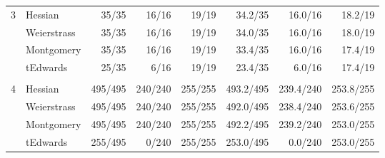 \begin{table}[!h]
\begin{tabular}{llrrrrrr}
\multicolumn{1}{|l|}{\multirow{4}{*}{3}} & \multicolumn{1}{l|}{Hessian}                & \multicolumn{1}{r|}{35/35}   & \multicolumn{1}{r|}{16/16}   & \multicolumn{1}{r|}{19/19}   & \multicolumn{1}{r|}{34.2/35}   & \multicolumn{1}{r|}{16.0/16}   & \multicolumn{1}{r|}{18.2/19}   \\ \cline{2-8} 
\multicolumn{1}{|l|}{}                   & \multicolumn{1}{l|}{Weierstrass}            & \multicolumn{1}{r|}{35/35}   & \multicolumn{1}{r|}{16/16}   & \multicolumn{1}{r|}{19/19}   & \multicolumn{1}{r|}{34.0/35}   & \multicolumn{1}{r|}{16.0/16}   & \multicolumn{1}{r|}{18.0/19}   \\ \cline{2-8} 
\multicolumn{1}{|l|}{}                   & \multicolumn{1}{l|}{Montgomery}             & \multicolumn{1}{r|}{35/35}   & \multicolumn{1}{r|}{16/16}   & \multicolumn{1}{r|}{19/19}   & \multicolumn{1}{r|}{33.4/35}   & \multicolumn{1}{r|}{16.0/16}   & \multicolumn{1}{r|}{17.4/19}   \\ \cline{2-8} 
\multicolumn{1}{|l|}{}                   & \multicolumn{1}{l|}{tEdwards}               & \multicolumn{1}{r|}{25/35}   & \multicolumn{1}{r|}{6/16}    & \multicolumn{1}{r|}{19/19}   & \multicolumn{1}{r|}{23.4/35}   & \multicolumn{1}{r|}{6.0/16}    & \multicolumn{1}{r|}{17.4/19}   \\ \hline  \vspace{-3.2mm}
                                         &                                             &                              &                              &                              &                                &                                &                                \\ \hline
\multicolumn{1}{|l|}{\multirow{4}{*}{4}} & \multicolumn{1}{l|}{Hessian}                & \multicolumn{1}{r|}{495/495} & \multicolumn{1}{r|}{240/240} & \multicolumn{1}{r|}{255/255} & \multicolumn{1}{r|}{493.2/495} & \multicolumn{1}{r|}{239.4/240} & \multicolumn{1}{r|}{253.8/255} \\ \cline{2-8} 
\multicolumn{1}{|l|}{}                   & \multicolumn{1}{l|}{Weierstrass}            & \multicolumn{1}{r|}{495/495} & \multicolumn{1}{r|}{240/240} & \multicolumn{1}{r|}{255/255} & \multicolumn{1}{r|}{492.0/495} & \multicolumn{1}{r|}{238.4/240} & \multicolumn{1}{r|}{253.6/255} \\ \cline{2-8} 
\multicolumn{1}{|l|}{}                   & \multicolumn{1}{l|}{Montgomery}             & \multicolumn{1}{r|}{495/495} & \multicolumn{1}{r|}{240/240} & \multicolumn{1}{r|}{255/255} & \multicolumn{1}{r|}{492.2/495} & \multicolumn{1}{r|}{239.2/240} & \multicolumn{1}{r|}{253.0/255} \\ \cline{2-8} 
\multicolumn{1}{|l|}{}                   & \multicolumn{1}{l|}{tEdwards}               & \multicolumn{1}{r|}{255/495} & \multicolumn{1}{r|}{0/240}   & \multicolumn{1}{r|}{255/255} & \multicolumn{1}{r|}{253.0/495} & \multicolumn{1}{r|}{0.0/240}   & \multicolumn{1}{r|}{253.0/255} \\ \hline
\end{tabular}
\end{table}



